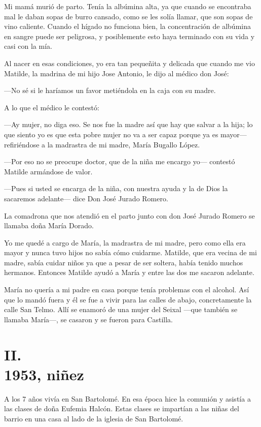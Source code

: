 \documentclass[12pt,a5paper]{book}
\begin{document}
Mi mamá murió de parto. Tenía la albúmina alta, ya que cuando se encontraba mal le daban sopas de burro cansado, como se les solía llamar, que son sopas de vino caliente. Cuando el hígado no funciona bien, la concentración de albúmina en sangre puede ser peligrosa, y posiblemente esto haya terminado con su vida y casi con la mía.

Al nacer en esas condiciones, yo era tan pequeñita y delicada que cuando me vio Matilde, la madrina de mi hijo Jose Antonio, le dijo al médico don José:

---No sé si le haríamos un favor metiéndola en la caja con su madre.

A lo que el médico le contestó:

---Ay mujer, no diga eso. Se nos fue la madre así que hay que salvar a la hija; lo que siento yo es que esta pobre mujer no va a ser capaz porque ya es mayor--- refiriéndose a la madrastra de mi madre, María Bugallo López.

---Por eso no se preocupe doctor, que de la niña me encargo yo--- contestó Matilde armándose de valor.

---Pues si usted se encarga de la niña, con nuestra ayuda y la de Dios la sacaremos adelante--- dice Don José Jurado Romero.

La comadrona que nos atendió en el parto junto con don José Jurado Romero se llamaba doña María Dorado.

Yo me quedé a cargo de María, la madrastra de mi madre, pero como ella era mayor y nunca tuvo hijos no sabía cómo cuidarme. Matilde, que era vecina de mi madre, sabía cuidar niños ya que a pesar de ser soltera, había tenido muchos hermanos. Entonces Matilde ayudó a María y entre las dos me sacaron adelante.

María no quería a mi padre en casa porque tenía problemas con el alcohol. Así que lo mandó fuera y él se fue a vivir para las calles de abajo, concretamente la calle San Telmo. Allí se enamoró de una mujer del Seixal ---que también se llamaba María---, se casaron y se fueron para Castilla.

\section*{II.\\1953, niñez}

A los 7 años vivía en San Bartolomé. En esa época hice la comunión y asistía a las clases de doña Eufemia Halcón. Estas clases se impartían a las niñas del barrio en una casa al lado de la iglesia de San Bartolomé.
\end{document}
